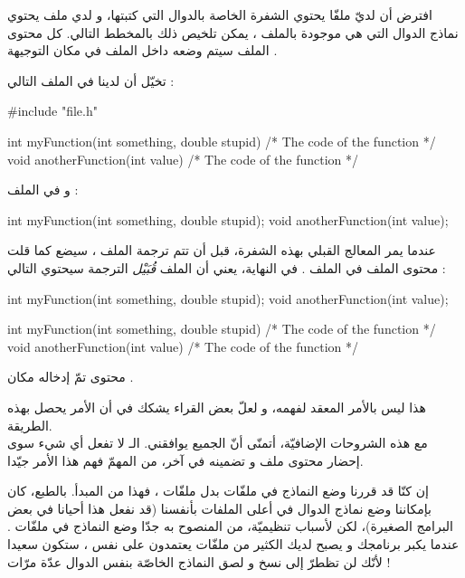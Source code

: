 افترض أن لديّ ملفّا
يحتوي الشفرة الخاصة بالدوال التي كتبتها، و لدي ملف
يحتوي نماذج الدوال التي هي موجودة بالملف
،
يمكن تلخيص ذلك بالمخطط التالي.
كل محتوى الملف
سيتم وضعه داخل الملف
في مكان التوجيهة
.

تخيّل أن لدينا في الملف
التالي :

\begin{Csource}
#include "file.h"

int myFunction(int something, double stupid)
{
  /* The code of the function */
}
void anotherFunction(int value)
{
  /* The code of the function */
}
\end{Csource}

و في الملف
 :

\begin{Csource}
int myFunction(int something, double stupid);
void anotherFunction(int value);
\end{Csource}

عندما يمر المعالج القبلي بهذه الشفرة، قبل أن تتم ترجمة الملف
،
سيضع كما قلت محتوى الملف
 في الملف
.
في النهاية، يعني أن الملف
\textit{قُبَيْل}
الترجمة سيحتوي التالي :

\begin{Csource}
int myFunction(int something, double stupid);
void anotherFunction(int value);

int myFunction(int something, double stupid)
{
  /* The code of the function */
}
void anotherFunction(int value)
{
  /* The code of the function */
}
\end{Csource}

محتوى
تمّ إدخاله مكان
.

هذا ليس بالأمر المعقد لفهمه، و لعلّ بعض القراء يشكك في أن الأمر يحصل بهذه الطريقة.\\
مع هذه الشروحات الإضافيّة، أتمنّى أنّ الجميع يوافقني.
الـ
لا تفعل أي شيء سوى إحضار محتوى ملف و تضمينه في آخر، من المهمّ فهم هذا الأمر جيّدا.

\begin{information}
  إن كنّا قد قررنا وضع النماذج في ملفّات
بدل ملفّات
،
فهذا من المبدأ.
بالطبع، كان بإمكاننا وضع نماذج الدوال في أعلى الملفات
بأنفسنا (قد نفعل هذا أحيانا في بعض البرامج الصغيرة)، لكن لأسباب تنظيميّة، من المنصوح به جدّا وضع النماذج في ملفّات
.
 عندما يكبر برنامجك و يصبح لديك الكثير من ملفّات
يعتمدون على نفس
،
ستكون سعيدا لأنّك لن تظطرّ إلى نسخ و لصق النماذج الخاصّة بنفس الدوال عدّة مرّات !
\end{information}

